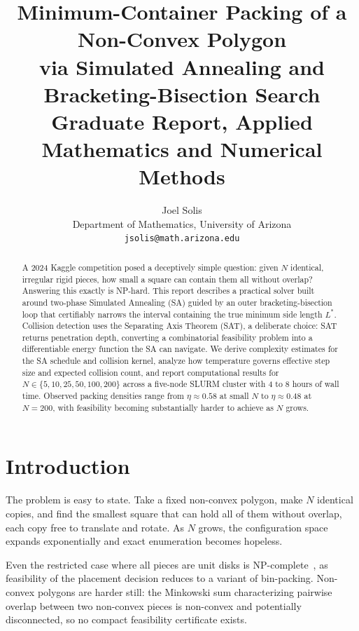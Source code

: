 \documentclass[10pt,twocolumn]{article}
\title{%
  \textbf{Minimum-Container Packing of a Non-Convex Polygon\\
  via Simulated Annealing and Bracketing-Bisection Search}\\[4pt]
  {\normalsize Graduate Report, Applied Mathematics and Numerical Methods}%
}
\author{Joel Solis\\[2pt]
  {\small Department of Mathematics, University of Arizona}\\
  {\small\texttt{jsolis@math.arizona.edu}}%
}
\date{}
\begin{document}
\maketitle
\thispagestyle{empty}

\begin{abstract}
A 2024 Kaggle competition posed a deceptively simple question: given
$N$ identical, irregular rigid pieces, how small a square can contain
them all without overlap? Answering this exactly is NP-hard.
This report describes a practical solver built around two-phase
Simulated Annealing (SA) guided by an outer bracketing-bisection loop
that certifiably narrows the interval containing the true minimum side
length $L^*$. Collision detection uses the Separating Axis Theorem (SAT),
a deliberate choice: SAT returns penetration depth, converting a
combinatorial feasibility problem into a differentiable energy function
the SA can navigate. We derive complexity estimates for the SA schedule
and collision kernel, analyze how temperature governs effective step size
and expected collision count, and report computational results for
$N \in \{5, 10, 25, 50, 100, 200\}$ across a five-node SLURM cluster
with 4 to 8 hours of wall time. Observed packing densities range from
$\eta \approx 0.58$ at small $N$ to $\eta \approx 0.48$ at $N = 200$,
with feasibility becoming substantially harder to achieve as $N$ grows.
\end{abstract}

\section{Introduction}
\label{sec:intro}

The problem is easy to state. Take a fixed non-convex polygon, make
$N$ identical copies, and find the smallest square that can hold all
of them without overlap, each copy free to translate and rotate. As
$N$ grows, the configuration space expands exponentially and exact
enumeration becomes hopeless.

Even the restricted case where all pieces are unit disks is
NP-complete~\cite{demaine2007}, as feasibility of the placement decision
reduces to a variant of bin-packing. Non-convex polygons are harder
still: the Minkowski sum characterizing pairwise overlap between two
non-convex pieces is non-convex and potentially disconnected, so no
compact feasibility certificate exists.
\end{document}
